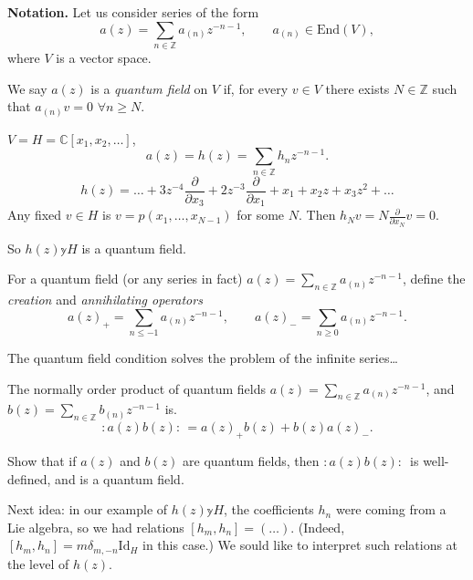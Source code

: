 \medskip\noindent
{\bf Notation.} Let us consider series of the form
$$
a(z)=\sum_{n \in \mathbb{Z}}a_{(n)}z^{-n-1},\qquad a_{(n)}\in \text{End}(V),
$$
where $V$ is a vector space.

\begin{definition}
\label{definition-quantum-field}
We say $a(z)$ is a {\it quantum field} on $V$ if,
for every $v \in V$ there exists $N \in \mathbb{Z}$ 
such that $a_{(n)}v=0$ $\forall  n\geq N$.
\end{definition}

\begin{example}
\label{example-quantum-field}
$V=H=\mathbb{C}[x_1,x_2,\ldots]$,
$$
a(z)=h(z)=\sum_{n \in \mathbb{Z}}h_n z^{-n-1}.
$$
$$
h(z)=\ldots+3z^{-4}\frac{\partial }{\partial x_3}
+2z^{-3}\frac{\partial }{\partial x_1}+x_1
+x_2z+x_3z^2+\ldots
$$
Any fixed $v \in H$ is $v=p(x_1,\ldots,x_{N-1})$ for some $N$.
Then $h_Nv=N \frac{\partial }{\partial x_N}v=0$.

So $h(z) \mathbb{y} H$ is a quantum field.
\end{example}

\begin{definition}
\label{definition-creating-annihilating-operators}
For a quantum field
(or any series in fact) $a(z)=\sum_{ n \in \mathbb{Z}}a_{(n)}z^{-n-1}$,
define the {\it creation} and {\it annihilating operators}
$$
a(z)_+=\sum_{n \leq -1}a_{(n)}z^{-n-1},\qquad 
a(z)_-=\sum_{n \geq 0}a_{(n)}z^{-n-1}.
$$
\end{definition}

The quantum field condition solves the problem of the infinite series…

The normally order product of quantum fields 
$a(z)=\sum_{n \in \mathbb{Z}}a_{(n)}z^{-n-1}$, and
$b(z)=\sum_{n \in \mathbb{Z}}b_{(n)}z^{-n-1}$ is.
$$
:\!a(z)b(z)\!:\,=a(z)_+b(z)+b(z)a(z)_-.
$$

\begin{exercise}
\label{exercise-most-important}
Show that if $a(z)$ and $b(z)$ are quantum fields,
then $:\!a(z)b(z)\!:\,$ is well-defined, and is a quantum field.
\end{exercise}

\medskip\noindent
Next idea: in our example of $h(z) \mathbb{y} H$,
the coefficients $h_n$ were coming from a Lie algebra,
so we had relations
 $[h_m,h_n]=(\ldots)$.
(Indeed, $[h_m,h_n]=m \delta_{m,-n}\text{Id}_H$ in this case.)
We sould like to interpret such relations at the level of $h(z)$.

